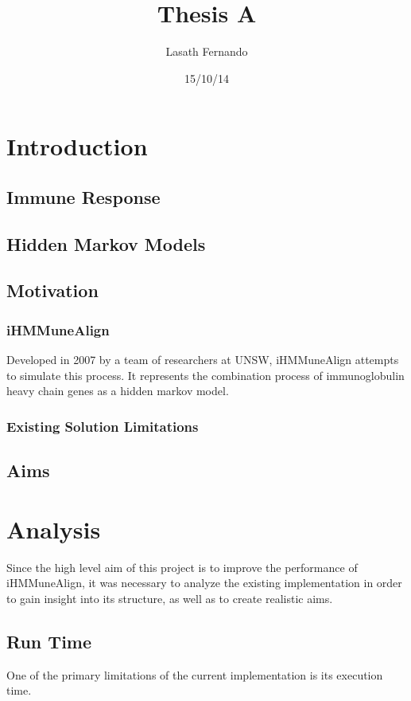 \documentclass[a4paper,12pt]{report}
\author{Lasath Fernando}
\title{Thesis A}
\date{15/10/14}
\begin{document}
\maketitle


\chapter{Introduction}
\section{Immune Response}
\section{Hidden Markov Models}
\section{Motivation}
\subsection{iHMMuneAlign}
Developed in 2007 by a team of researchers at UNSW, iHMMuneAlign attempts to simulate this process.
It represents the combination process of immunoglobulin heavy chain genes as a hidden markov model.
\subsection{Existing Solution Limitations}

\section{Aims}

\chapter{Analysis}
Since the high level aim of this project is to improve the performance of iHMMuneAlign, it was necessary to analyze the existing implementation in order to gain insight into its structure, as well as to create realistic aims. 

\section{Run Time}
One of the primary limitations of the current implementation is its execution time. 

\end{document}
